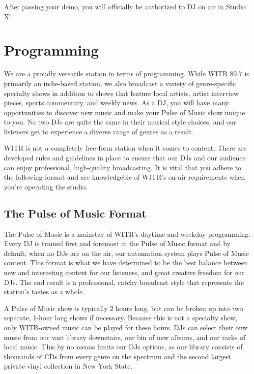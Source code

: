 \documentclass{witrman}
\begin{document}
After passing your demo, you will officially be authorized to DJ on air in
Studio X!


\chapter{Programming}

We are a proudly versatile station in terms of programming.  While WITR 89.7 is
primarily an indie-based station, we also broadcast a variety of genre-specific
specialty shows in addition to shows that feature local artists, artist
interview pieces, sports commentary, and weekly news.  As a DJ, you will have
many opportunities to discover new music and make your Pulse of Music show
unique to you.  No two DJs are quite the same in their musical style choices,
and our listeners get to experience a diverse range of genres as a result.

WITR is not a completely free-form station when it comes to content.  There are
developed rules and guidelines in place to ensure that our DJs and our audience
can enjoy professional, high-quality broadcasting.  It is vital that you adhere
to the following format and are knowledgeble of WITR's on-air requirements when
you're operating the studio.

\section{The Pulse of Music Format}

The Pulse of Music is a mainstay of WITR's daytime and weekday programming.
Every DJ is trained first and foremost in the Pulse of Music format and by
default, when no DJs are on the air, our automation system plays Pulse of Music
content.  This format is what we have determined to be the best balance between
new and interesting content for our listeners, and great creative freedom for
our DJs.  The end result is a professional, catchy broadcast style that
represents the station's tastes as a whole.

A Pulse of Music show is typically 2 hours long, but can be broken up into two
separate, 1-hour long shows if necessary.  Because this is not a specialty show,
only WITR-owned music can be played for these hours.  DJs can select their onw
music from our vast library downstairs, our bin of new albums, and our racks of
local music.  This by no means limits our DJs options, as our library consists
of thousands of CDs from every genre on the spectrum and the second largest
private vinyl collection in New York State.
\end{document}
